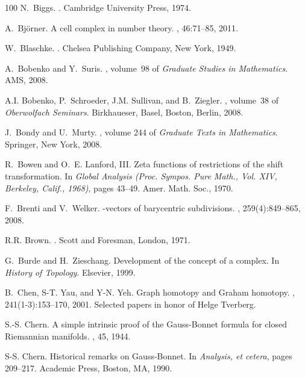 \documentclass[12pt]{amsart}
\begin{document}
\begin{thebibliography}{100}
N.~Biggs.
.
\newblock Cambridge University Press, 1974.

A.~Bj{\"o}rner.
\newblock A cell complex in number theory.
, 46:71--85, 2011.

W.~Blaschke.
.
\newblock Chelsea Publishing Company, New York, 1949.

A.~Bobenko and Y.~Suris.
, volume~98
  of {\em Graduate Studies in Mathematics}.
\newblock AMS, 2008.

A.I. Bobenko, P.~Schroeder, J.M. Sullivan, and B.~Ziegler.
, volume~38 of {\em Oberwolfach
  Seminars}.
\newblock Birkhaueser, Basel, Boston, Berlin, 2008.

J.~Bondy and U.~Murty.
, volume 244 of {\em Graduate Texts in
  Mathematics}.
\newblock Springer, New York, 2008.

R.~Bowen and O.~E. {L}anford, III.
\newblock Zeta functions of restrictions of the shift transformation.
\newblock In {\em Global {A}nalysis ({P}roc. {S}ympos. {P}ure {M}ath., {V}ol.
  {XIV}, {B}erkeley, {C}alif., 1968)}, pages 43--49. Amer. Math. Soc., 1970.

F.~Brenti and V.~Welker.
-vectors of barycentric subdivisions.
, 259(4):849--865, 2008.

R.R. Brown.
.
\newblock Scott and Foresman, London, 1971.

G.~Burde and H.~Zieschang.
\newblock Development of the concept of a complex.
\newblock In {\em History of Topology}. Elsevier, 1999.

B.~Chen, S-T. Yau, and Y-N. Yeh.
\newblock Graph homotopy and {G}raham homotopy.
, 241(1-3):153--170, 2001.
\newblock Selected papers in honor of Helge Tverberg.

S.-S. Chern.
\newblock A simple intrinsic proof of the {Gauss-Bonnet} formula for closed
  {Riemannian} manifolds.
, 45, 1944.

S-S. Chern.
\newblock Historical remarks on {G}auss-{B}onnet.
\newblock In {\em Analysis, et cetera}, pages 209--217. Academic Press, Boston,
  MA, 1990.


\end{thebibliography}
\end{document}

